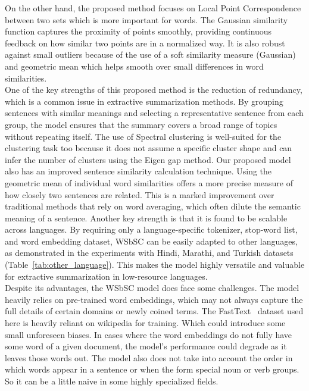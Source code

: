 On the other hand, the proposed method focuses on Local Point Correspondence between
two sets which is more important for words.
The Gaussian similarity function captures the proximity of points smoothly,
providing continuous feedback on how similar two points are in a normalized way.
It is also robust against small outliers because of the use of a soft similarity measure (Gaussian)
and geometric mean which helps smooth over small differences in word similarities.\\

One of the key strengths of this proposed method is the reduction of redundancy,
which is a common issue in extractive summarization methods.
By grouping sentences with similar meanings and selecting a representative
sentence from each group, the model ensures that the summary covers
a broad range of topics without repeating itself.
The use of Spectral clustering is well-suited for the clustering task too
because it does not assume a specific cluster shape
and can infer the number of clusters using the Eigen gap method.
Our proposed model also has an improved sentence similarity calculation technique.
Using the geometric mean of individual word similarities offers a more precise measure
of how closely two sentences are related.
This is a marked improvement over traditional methods that
rely on word averaging, which often dilute the semantic meaning of a sentence.
Another key strength is that it is found to be scalable across languages.
By requiring only a language-specific tokenizer, stop-word list, and word embedding dataset,
WSbSC can be easily adapted to other languages, as demonstrated in the experiments with
Hindi, Marathi, and Turkish datasets (Table~\ref{tab:other_language}).
This makes the model highly versatile and valuable for extractive summarization in low-resource languages.\\

Despite its advantages, the WSbSC model does face some challenges.
The model heavily relies on pre-trained word embeddings,
which may not always capture the full details of certain domains or newly coined terms.
The FastText~\cite{grave-etal-2018-fasttext} dataset used here is
heavily reliant on wikipedia for training.
Which could introduce some small unforeseen biases.
In cases where the word embeddings do not fully have some word of a given document,
the model’s performance could degrade as it leaves those words out.
The model also does not take into account the order in which words appear in a sentence
or when the form special noun or verb groups.
So it can be a little naive in some highly specialized fields.\\

